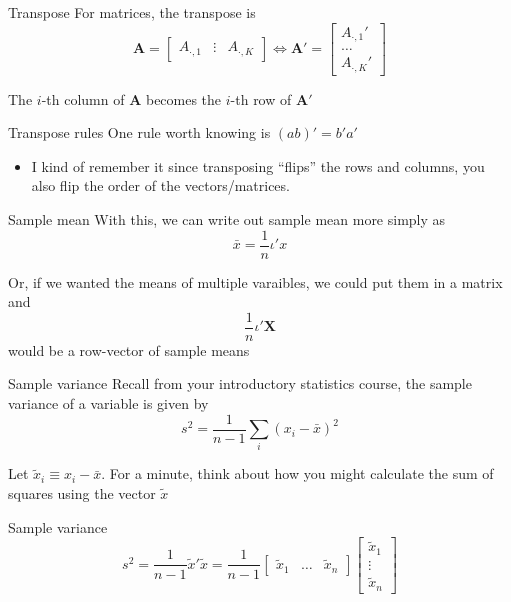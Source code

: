 \documentclass[aspectratio=169,t,11pt,table]{beamer}
\begin{document}
\begin{frame}{Transpose}
  For matrices, the transpose is
  $$
    \bm{A} = \begin{bmatrix} A_{\cdot, 1} & \vdots & A_{\cdot, K} \end{bmatrix} \iff \bm{A}' = \begin{bmatrix} A_{\cdot, 1}' \\ \dots \\ A_{\cdot, K}' \end{bmatrix}
  $$

  \bigskip
  The $i$-th column of $\bm{A}$ becomes the $i$-th row of $\bm{A}'$
\end{frame}

\begin{frame}{Transpose rules}
  One rule worth knowing is $(ab)' = b' a'$

  \begin{itemize}
    \item I kind of remember it since transposing ``flips'' the rows and columns, you also flip the order of the vectors/matrices.
  \end{itemize}
\end{frame}

\begin{frame}{Sample mean}
  With this, we can write out sample mean more simply as 
  $$
    \bar{x} = \frac{1}{n} \iota' x
  $$
  
  Or, if we wanted the means of multiple varaibles, we could put them in a matrix and $$\frac{1}{n} \iota' \bm{X}$$ would be a row-vector of sample means
\end{frame}

\begin{frame}{Sample variance}
  Recall from your introductory statistics course, the sample variance of a variable is given by
  $$
    s^2 = \frac{1}{n-1} \sum_i (x_i - \bar{x})^2
  $$

  \bigskip
  Let $\tilde{x}_i \equiv x_i - \bar{x}$. For a minute, think about how you might calculate the sum of squares using the vector $\tilde{x}$
\end{frame}

\begin{frame}{Sample variance}
  \vspace*{-\bigskipamount}
  $$
    s^2 = \frac{1}{n-1} \tilde{x}' \tilde{x} = 
    \frac{1}{n-1} \begin{bmatrix}\tilde{x}_1 & \dots & \tilde{x}_n\end{bmatrix}
    \begin{bmatrix}\tilde{x}_1 \\ \vdots \\ \tilde{x}_n\end{bmatrix}
  $$
\end{frame}
\end{document}
